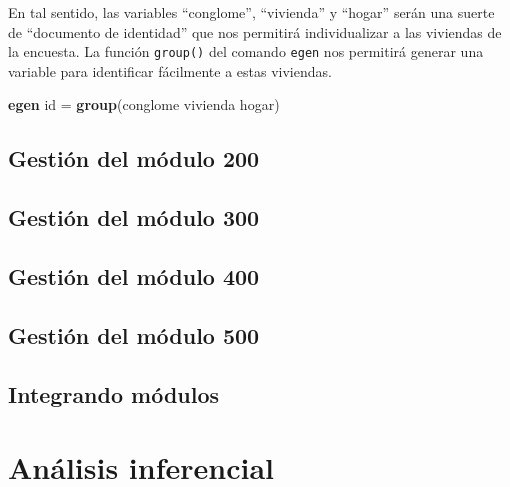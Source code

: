 \documentclass[
]{book}
\newenvironment{Shaded}{\begin{snugshade}}{\end{snugshade}}
\newcommand{\FunctionTok}[1]{\textcolor[rgb]{0.13,0.29,0.53}{\textbf{#1}}}
\newcommand{\KeywordTok}[1]{\textcolor[rgb]{0.13,0.29,0.53}{\textbf{#1}}}
\newcommand{\NormalTok}[1]{#1}
\theoremstyle{definition}
\theoremstyle{definition}
\theoremstyle{definition}
\theoremstyle{definition}
\theoremstyle{remark}
\begin{document}
En tal sentido, las variables ``conglome'', ``vivienda'' y ``hogar'' serán una suerte de ``documento de identidad'' que nos permitirá individualizar a las viviendas de la encuesta. La función \texttt{group()} del comando \texttt{egen} nos permitirá generar una variable para identificar fácilmente a estas viviendas.

\begin{Shaded}
\begin{Highlighting}[]

\KeywordTok{egen}\NormalTok{ id = }\FunctionTok{group}\NormalTok{(conglome vivienda hogar)}
\end{Highlighting}
\end{Shaded}

\hypertarget{gestiuxf3n-del-muxf3dulo-200}{%
\section{Gestión del módulo 200}\label{gestiuxf3n-del-muxf3dulo-200}}

\hypertarget{gestiuxf3n-del-muxf3dulo-300}{%
\section{Gestión del módulo 300}\label{gestiuxf3n-del-muxf3dulo-300}}

\hypertarget{gestiuxf3n-del-muxf3dulo-400}{%
\section{Gestión del módulo 400}\label{gestiuxf3n-del-muxf3dulo-400}}

\hypertarget{gestiuxf3n-del-muxf3dulo-500}{%
\section{Gestión del módulo 500}\label{gestiuxf3n-del-muxf3dulo-500}}

\hypertarget{integrando-muxf3dulos}{%
\section{Integrando módulos}\label{integrando-muxf3dulos}}

\hypertarget{anuxe1lisis-inferencial}{%
\chapter{Análisis inferencial}\label{anuxe1lisis-inferencial}}
\end{document}
